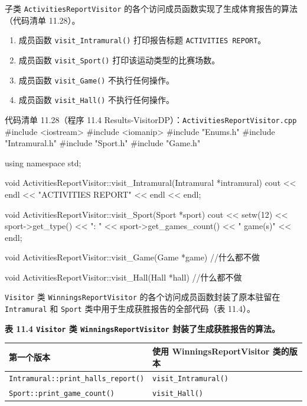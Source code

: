 子类 \texttt{Activities\allowbreak{}Report\allowbreak{}Visitor} 的各个访问成员函数实现了生成体育报告的算法（代码清单 11.28）。

\begin{enumerate}
\item 成员函数 \texttt{visit\_\allowbreak{}Intramural(\allowbreak{})\allowbreak{}} 打印报告标题 \texttt{ACTIVITIES REPORT}。
\item 成员函数 \texttt{visit\_\allowbreak{}Sport(\allowbreak{})\allowbreak{}} 打印该运动类型的比赛场数。
\item 成员函数 \texttt{visit\_\allowbreak{}Game(\allowbreak{})\allowbreak{}} 不执行任何操作。
\item 成员函数 \texttt{visit\_\allowbreak{}Hall(\allowbreak{})\allowbreak{}} 不执行任何操作。
\end{enumerate}

\begin{codeboxt}{代码清单 11.28（程序 11.4 Results-VisitorDP）：\texttt{Activities\allowbreak{}Report\allowbreak{}Visitor.\allowbreak{}cpp}}
#include <iostream>
#include <iomanip>
#include "Enums.h"
#include "Intramural.h"
#include "Sport.h"
#include "Game.h"

using namespace std;

void ActivitiesReportVisitor::visit_Intramural(Intramural *intramural)
{
    cout << endl << "ACTIVITIES REPORT" << endl << endl;
}

void ActivitiesReportVisitor::visit_Sport(Sport *sport)
{
    cout << setw(12) << sport->get_type() << ": "
         << sport->get_games_count() << " game(s)" << endl;
}

void ActivitiesReportVisitor::visit_Game(Game *game)
{
    //什么都不做
}

void ActivitiesReportVisitor::visit_Hall(Hall *hall)
{
    //什么都不做
}
\end{codeboxt}

\texttt{Visitor} 类 \texttt{Winnings\allowbreak{}Report\allowbreak{}Visitor} 的各个访问成员函数封装了原本驻留在 \texttt{Intramural} 和 \texttt{Sport} 类中用于生成获胜报告的全部代码（表 11.4）。

\begin{center}
{\bfseries 表 11.4 \texttt{Visitor} 类 \texttt{Winnings\allowbreak{}Report\allowbreak{}Visitor} 封装了生成获胜报告的算法。}\par\vspace{3bp}
\begin{tabularx}{\textwidth}{XX}
\toprule
第一个版本 & 使用 WinningsReportVisitor 类的版本 \\
\midrule
\texttt{Intramural::\allowbreak{}print\_\allowbreak{}halls\_\allowbreak{}report(\allowbreak{})\allowbreak{}} & \texttt{visit\_\allowbreak{}Intramural(\allowbreak{})\allowbreak{}} \\
\texttt{Sport::\allowbreak{}print\_\allowbreak{}game\_\allowbreak{}count(\allowbreak{})\allowbreak{}} & \texttt{visit\_\allowbreak{}Hall(\allowbreak{})\allowbreak{}} \\
\bottomrule
\end{tabularx}
\end{center}

